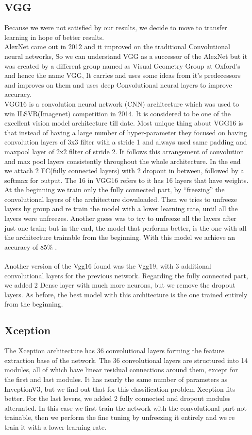 \documentclass[11pt, oneside]{article}
\begin{document}
\subsection{VGG}
Because we were not satisfied by our results, we decide to move to transfer learning in hope of better results.\\ AlexNet came out in 2012 and it improved on the traditional Convolutional neural networks, So we can understand VGG as a successor of the AlexNet but it was created by a different group named as Visual Geometry Group at Oxford's and hence the name VGG, It carries and uses some ideas from it's predecessors and improves on them and uses deep Convolutional neural layers to improve accuracy.\\
VGG16 is a convolution neural network (CNN) architecture which was used to win ILSVR(Imagenet) competition in 2014. It is considered to be one of the excellent vision model architecture till date. Most unique thing about VGG16 is that instead of having a large number of hyper-parameter they focused on having convolution layers of 3x3 filter with a stride 1 and always used same padding and maxpool layer of 2x2 filter of stride 2. It follows this arrangement of convolution and max pool layers consistently throughout the whole architecture. In the end we attach 2 FC(fully connected layers) with 2 dropout in between, followed by a softmax for output. The 16 in VGG16 refers to it has 16 layers that have weights.\\ At the beginning we train only the fully connected part, by “freezing” the convolutional layers of the architecture downloaded. Then we tries to unfreeze layers by group and re train the model with a lower learning rate, until all the layers were unfreezes. Another guess was to try to unfreeze all the layers after just one train; but in the end, the model that performs better, is the one with all the architecture trainable from the beginning. With this model we achieve an accuracy of 85\% . \\ \\
Another version of the Vgg16 found was the Vgg19, with 3 additional convolutional layers for the previous network. Regarding the fully connected part, we added 2 Dense layer with much more neurons, but we remove the dropout layers. As before, the best model with this architecture is the one trained entirely from the beginning.
\subsection{Xception}
The Xception architecture has 36 convolutional layers forming the feature extraction base of the network. The 36 convolutional layers are structured into 14 modules, all of which have linear residual connections around them, except for the first and last modules. It has nearly the same number of parameters as InveptionV3, but we find out that for this classification problem Xception fits better. For the last levers, we added 2 fully connected and dropout modules alternated. In this case we first train the network with the convolutional part not trainable, then we perform the fine tuning by unfreezing it entirely and we re train it with a lower learning rate.
\end{document}
